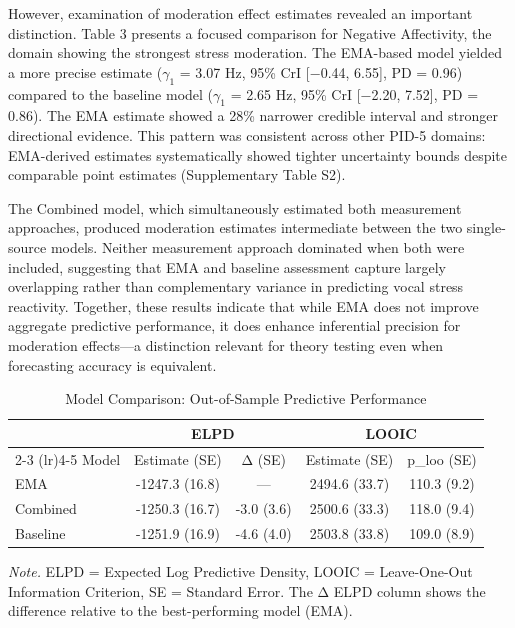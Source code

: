 \documentclass[
  english,
  man]{apa6}
\begin{document}
However, examination of moderation effect estimates revealed an important distinction. Table 3 presents a focused comparison for Negative Affectivity, the domain showing the strongest stress moderation. The EMA-based model yielded a more precise estimate (\(\gamma_1\)\hspace{0pt} = 3.07 Hz, 95\% CrI {[}−0.44, 6.55{]}, PD = 0.96) compared to the baseline model (\(\gamma_1\)\hspace{0pt} = 2.65 Hz, 95\% CrI {[}−2.20, 7.52{]}, PD = 0.86). The EMA estimate showed a 28\% narrower credible interval and stronger directional evidence. This pattern was consistent across other PID-5 domains: EMA-derived estimates systematically showed tighter uncertainty bounds despite comparable point estimates (Supplementary Table S2).

The Combined model, which simultaneously estimated both measurement approaches, produced moderation estimates intermediate between the two single-source models. Neither measurement approach dominated when both were included, suggesting that EMA and baseline assessment capture largely overlapping rather than complementary variance in predicting vocal stress reactivity. Together, these results indicate that while EMA does not improve aggregate predictive performance, it does enhance inferential precision for moderation effects---a distinction relevant for theory testing even when forecasting accuracy is equivalent.

\begin{table}[h]
\caption{Model Comparison: Out-of-Sample Predictive Performance}
\label{tab:model-comparison}
\small
\begin{tabular}{lcccc}
\hline
 & \multicolumn{2}{c}{ELPD} & \multicolumn{2}{c}{LOOIC} \\
\cmidrule(lr){2-3} \cmidrule(lr){4-5}
Model & Estimate (SE) & Δ (SE) & Estimate (SE) & p\_loo (SE) \\
\hline
EMA & -1247.3 (16.8) & — & 2494.6 (33.7) & 110.3 (9.2) \\
Combined & -1250.3 (16.7) & -3.0 (3.6) & 2500.6 (33.3) & 118.0 (9.4) \\
Baseline & -1251.9 (16.9) & -4.6 (4.0) & 2503.8 (33.8) & 109.0 (8.9) \\
\hline
\end{tabular}
\begin{tablenotes}
\small
\item \textit{Note.} ELPD = Expected Log Predictive Density, LOOIC = Leave-One-Out Information Criterion, SE = Standard Error. The Δ ELPD column shows the difference relative to the best-performing model (EMA).
\end{tablenotes}
\end{table}
\end{document}

